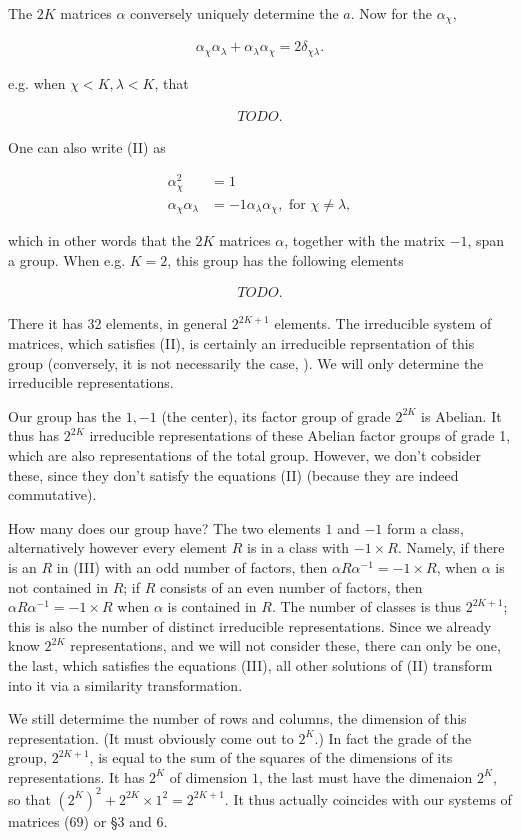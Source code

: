 \documentclass{article}
\newcommand{\nequ}[2]{
\begin{align*}
#1
\tag{#2}
\end{align*}
}
\newcommand{\uequ}[1]{
\begin{align*}
#1
\end{align*}
}
\begin{document}
The $2K$ matrices $\alpha$ conversely uniquely determine the $a$. Now for the $\alpha_\chi$, 
\nequ{
\alpha_\chi\alpha_\lambda + \alpha_\lambda\alpha_\chi = 2\delta_{\chi\lambda}.
}{II}

 e.g. when $\chi < K, \lambda < K$, that
\uequ{TODO.}

One can also write (II) as
\nequ{
\alpha_\chi^2 &= 1\\
\alpha_\chi\alpha_\lambda &= -1\alpha_\lambda\alpha_\chi, \text{ for } \chi \neq \lambda,
}{IIa}
which in other words  that the $2K$ matrices $\alpha$, together with the matrix $-1$, span a group. When e.g. $K=2$, this group has the following elements
\nequ{
TODO.
}{III}

There it has 32 elements, in general $2^{2K+1}$ elements. The irreducible system of matrices, which satisfies (II), is certainly an irreducible reprsentation of this group (conversely, it is not necessarily the case, ). We will only determine the irreducible representations.

Our group has the  $1, -1$ (the center), its factor group of grade $2^{2K}$ is Abelian. It thus has $2^{2K}$ irreducible representations of these Abelian factor groups of grade 1, which are also representations of the total group. However, we don't cobsider these, since they don't satisfy the equations (II) (because they are indeed commutative).

How many  does our group have? The two elements $1$ and $-1$ form a class, alternatively however every element $R$ is in a class with $-1\times R$. Namely, if there is an $R$ in (III) with an odd number of factors, then $\alpha R \alpha^{-1}=-1\times R$, when $\alpha$ is not contained in $R$; if $R$ consists of an even number of factors, then $\alpha R \alpha^{-1} = -1\times R$ when $\alpha$ is contained in $R$. The number of classes is thus $2^{2K+1}$; this is also the number of distinct irreducible representations. Since we already know $2^{2K}$ representations, and we will not consider these, there can only be one, the last, which satisfies the equations (III), all other solutions of (II) transform into it via a similarity transformation.

We still determime the number of rows and columns, the dimension of this representation. (It must obviously come out to $2^K$.) In fact the grade of the group, $2^{2K+1}$, is equal to the sum of the squares of the dimensions of its representations. It has $2^K$ of dimension $1$, the last must have the dimenaion $2^K$, so that $(2^K)^2 + 2^{2K}\times 1^2 = 2^{2K+1}$. It thus actually coincides with our systems of matrices (69) or §3 and 6.
\end{document}
